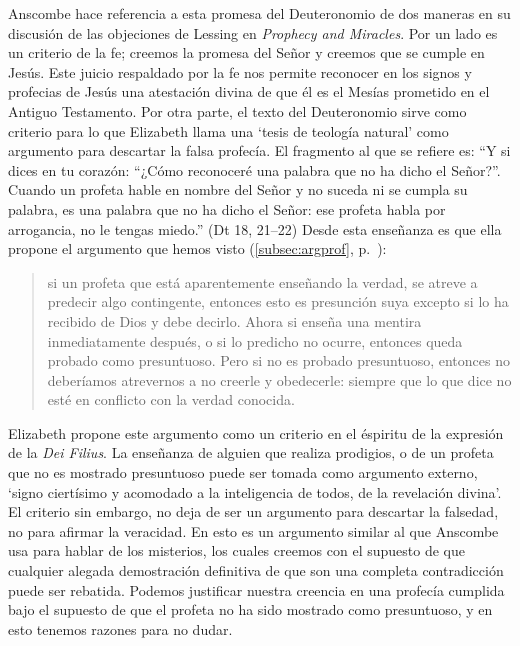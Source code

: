 Anscombe hace referencia a esta promesa del Deuteronomio de dos maneras en su discusión de las objeciones de Lessing en \emph{Prophecy and Miracles}. Por un lado es un criterio de la fe; creemos la promesa del Señor y creemos que se cumple en Jesús. Este juicio respaldado por la fe nos permite reconocer en los signos y profecias de Jesús una atestación divina de que él es el Mesías prometido en el Antiguo Testamento. Por otra parte, el texto del Deuteronomio sirve como criterio para lo que Elizabeth llama una `tesis de teología natural' como argumento para descartar la falsa profecía. El fragmento al que se refiere es: \enquote{Y si dices en tu corazón: ``¿Cómo reconoceré una palabra que no ha dicho el Señor?''. Cuando un profeta hable en nombre del Señor y no suceda ni se cumpla su palabra, es una palabra que no ha dicho el Señor: ese profeta habla por arrogancia, no le tengas miedo.} (Dt 18, 21--22) Desde esta enseñanza es que ella propone el argumento que hemos visto (\ref{subsec:argprof}, p.~\pageref{subsec:argprof}): \blockquote{si un profeta que está aparentemente enseñando la verdad, se atreve a predecir algo contingente, entonces esto es presunción suya excepto si lo ha recibido de Dios y debe decirlo. Ahora si enseña una mentira inmediatamente después, o si lo predicho no ocurre, entonces queda probado como presuntuoso. Pero si no es probado presuntuoso, entonces no deberíamos atrevernos a no creerle y obedecerle: siempre que lo que dice no esté en conflicto con la verdad conocida.} Elizabeth propone este argumento como un criterio en el éspiritu de la expresión de la \emph{Dei Filius}. La enseñanza de alguien que realiza prodigios, o de un profeta que no es mostrado presuntuoso puede ser tomada como argumento externo, \enquote*{signo ciertísimo y acomodado a la inteligencia de todos, de la revelación divina}. El criterio sin embargo, no deja de ser un argumento para descartar la falsedad, no para afirmar la veracidad. En esto es un argumento similar al que Anscombe usa para hablar de los misterios, los cuales creemos con el supuesto de que cualquier alegada demostración definitiva de que son una completa contradicción puede ser rebatida. Podemos justificar nuestra creencia en una profecía cumplida bajo el supuesto de que el profeta no ha sido mostrado como presuntuoso, y en esto tenemos razones para no dudar.

